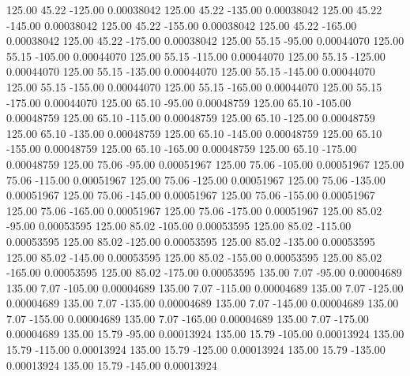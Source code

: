     125.00     45.22   -125.00     0.00038042
    125.00     45.22   -135.00     0.00038042
    125.00     45.22   -145.00     0.00038042
    125.00     45.22   -155.00     0.00038042
    125.00     45.22   -165.00     0.00038042
    125.00     45.22   -175.00     0.00038042
    125.00     55.15    -95.00     0.00044070
    125.00     55.15   -105.00     0.00044070
    125.00     55.15   -115.00     0.00044070
    125.00     55.15   -125.00     0.00044070
    125.00     55.15   -135.00     0.00044070
    125.00     55.15   -145.00     0.00044070
    125.00     55.15   -155.00     0.00044070
    125.00     55.15   -165.00     0.00044070
    125.00     55.15   -175.00     0.00044070
    125.00     65.10    -95.00     0.00048759
    125.00     65.10   -105.00     0.00048759
    125.00     65.10   -115.00     0.00048759
    125.00     65.10   -125.00     0.00048759
    125.00     65.10   -135.00     0.00048759
    125.00     65.10   -145.00     0.00048759
    125.00     65.10   -155.00     0.00048759
    125.00     65.10   -165.00     0.00048759
    125.00     65.10   -175.00     0.00048759
    125.00     75.06    -95.00     0.00051967
    125.00     75.06   -105.00     0.00051967
    125.00     75.06   -115.00     0.00051967
    125.00     75.06   -125.00     0.00051967
    125.00     75.06   -135.00     0.00051967
    125.00     75.06   -145.00     0.00051967
    125.00     75.06   -155.00     0.00051967
    125.00     75.06   -165.00     0.00051967
    125.00     75.06   -175.00     0.00051967
    125.00     85.02    -95.00     0.00053595
    125.00     85.02   -105.00     0.00053595
    125.00     85.02   -115.00     0.00053595
    125.00     85.02   -125.00     0.00053595
    125.00     85.02   -135.00     0.00053595
    125.00     85.02   -145.00     0.00053595
    125.00     85.02   -155.00     0.00053595
    125.00     85.02   -165.00     0.00053595
    125.00     85.02   -175.00     0.00053595
    135.00      7.07    -95.00     0.00004689
    135.00      7.07   -105.00     0.00004689
    135.00      7.07   -115.00     0.00004689
    135.00      7.07   -125.00     0.00004689
    135.00      7.07   -135.00     0.00004689
    135.00      7.07   -145.00     0.00004689
    135.00      7.07   -155.00     0.00004689
    135.00      7.07   -165.00     0.00004689
    135.00      7.07   -175.00     0.00004689
    135.00     15.79    -95.00     0.00013924
    135.00     15.79   -105.00     0.00013924
    135.00     15.79   -115.00     0.00013924
    135.00     15.79   -125.00     0.00013924
    135.00     15.79   -135.00     0.00013924
    135.00     15.79   -145.00     0.00013924
